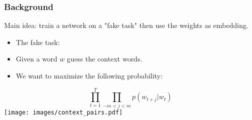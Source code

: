\begin{frame}\frametitle{Background}
Main idea: train a network on a "fake task" then use the weights as embedding. \bigskip
\begin{itemize}
\item The fake task:
\item Given a word $w$ guess the context words. 
\item We want to maximize the following probability:
\end{itemize}
\begin{equation}
\prod_{t=1}^T \prod_{-m<j<m}  p(w_{t+j}|w_t)
\end{equation}
\texttt{[image: images/context\_pairs.pdf]}
\end{frame}